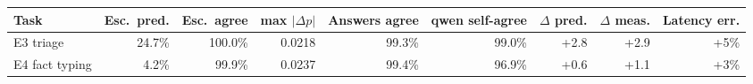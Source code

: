 \begin{tabular}{lrrrrrrrr}
\toprule
Task & Esc.\ pred. & Esc.\ agree & max $|\Delta p|$ & Answers agree & qwen self-agree & $\Delta$ pred. & $\Delta$ meas. & Latency err. \\
\midrule
E3 triage & 24.7\% & 100.0\% & 0.0218 & 99.3\% & 99.0\% & +2.8 & +2.9 & +5\% \\
E4 fact typing & 4.2\% & 99.9\% & 0.0237 & 99.4\% & 96.9\% & +0.6 & +1.1 & +3\% \\
\bottomrule
\end{tabular}
